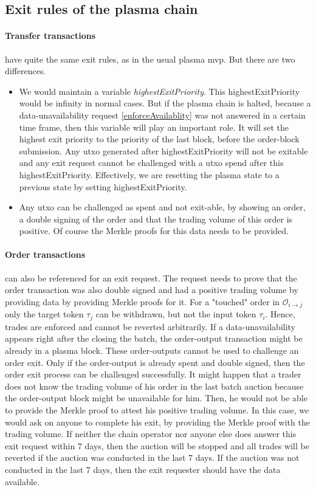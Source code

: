 \documentclass[11pt,parskip=full]{scrartcl}%
\def\pO{\mathcal{O}}
\def\ra{\rightarrow}
\begin{document}
\subsection{Exit rules of the plasma chain}
\label{exitRules}
\paragraph{Transfer transactions} have quite the same exit rules, as in the usual plasma mvp. 
But there are two differences.
\begin{itemize}

 \item We would maintain a variable \emph{highestExitPriority}. 
This highestExitPriority would be infinity in normal cases. 
But if the plasma chain is halted, because a data-unavailability request \ref{enforceAvailablity} was not answered in a certain time frame, then this variable will play an important role. 
It will set the highest exit priority to the priority of the last block, before the order-block submission. 
Any utxo generated after highestExitPriority will not be exitable and any exit request cannot be challenged with a utxo spend after this highestExitPriority. 
Effectively, we are resetting the plasma state to a previous state by setting highestExitPriority. 
\item Any utxo can be challenged as spent and not exit-able, by showing an order, a double signing of the order and that the trading volume of this order is positive. Of course the Merkle proofs for this data needs to be provided.

\end{itemize}

\paragraph{Order transactions} can also be referenced for an exit request. The request needs to prove that the order transaction was also double signed and had a positive trading volume by providing data by providing Merkle proofs for it.
For a "touched" order in $\pO_{i\ra j}$ only the target token $\tau_j$ can be withdrawn, but not the input token $\tau_i$. 
Hence, trades are enforced and cannot be reverted arbitrarily. 
If a data-unavailability appears right after the closing the batch, the order-output transaction might be already in a plasma block. 
These order-outputs cannot be used to challenge an order exit. 
Only if the order-output is already spent and double signed, then the order exit process can be challenged successfully. 
It might happen that a trader does not know the trading volume of his order in the last batch auction because the order-output block might be unavailable for him. 
Then, he would not be able to provide the Merkle proof to attest his positive trading volume. 
In this case, we would ask on anyone to complete his exit, by providing the Merkle proof with the trading volume. 
If neither the chain operator nor anyone else does answer this exit request within 7 days, then the auction will be stopped and all trades will be reverted if the auction was conducted in the last 7 days. If the auction was not conducted in the last 7 days, then the exit requester should have the data available.
\end{document}

